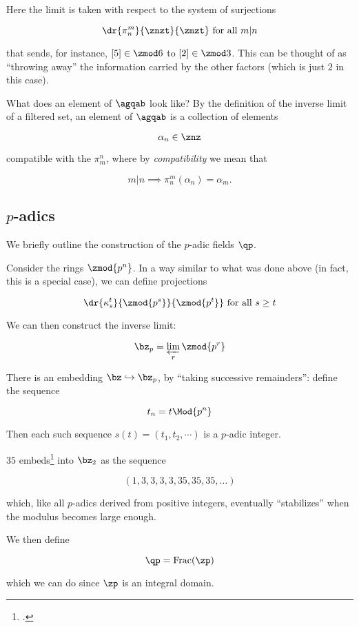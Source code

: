 Here the limit is taken with respect to the system of surjections

\[ \dr {\pi_ n^m} {\znzt} {\zmzt} \text{ for all } m|n \]

that sends, for instance, $[5]\in{\zmod 6}$ to $[2]\in\zmod 3$. This can be
thought of as ``throwing away'' the information carried by the other factors
(which is just $2$ in this case).

What does an element of $\agqab$ look like? By the definition of the inverse
limit of a filtered set, an element of $\agqab$ is a collection of
elements

\[ \alpha_n \in \znz \]

compatible with the $\pi_m^n$, where by
\textit{compatibility} we mean that

\[ m|n \implies \pi_n^m(\alpha_n) = \alpha_m. \]

\subsection{$p$-adics}
We briefly outline the construction of the $p$-adic fields $\qp$.

Consider the rings $\zmod {p^n}$. In a way similar to what was done above (in
fact, this is a special case), we can define projections

\[ \dr {\kappa_ s^t} {\zmod {p^s}} {\zmod {p^t}} \text{ for all } s \ge t \]

We can then construct the inverse limit:

\[ \bz_p = \varprojlim_r \zmod {p^r} \]

There is an embedding $\bz\hookrightarrow\bz_p$, by ``taking successive
remainders'': define the sequence

\[ t_n = t \Mod{p^n} \]

Then each such sequence $s(t) = (t_1, t_2, \cdots)$ is a $p$-adic integer.

\begin{example}
  $35$ embeds\footcite{Wikipedia} into $\bz_2$ as the sequence

  \[  (1, 3, 3, 3, 3, 35, 35, 35, \ldots)\]

  which, like all $p$-adics derived from positive integers, eventually ``stabilizes'' when
  the modulus becomes large enough.
\end{example}

We then define

\[ \qp = \rm{Frac}(\zp) \]

which we can do since $\zp$ is an integral domain.

